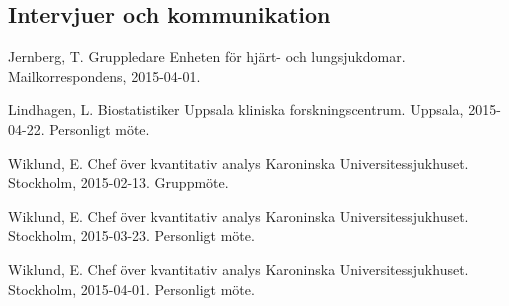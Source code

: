 \subsection{Intervjuer och kommunikation} 
	 	 		
Jernberg, T. Gruppledare Enheten för hjärt- och lungsjukdomar. Mailkorrespondens, 2015-04-01.	\newline				

Lindhagen, L. Biostatistiker Uppsala kliniska forskningscentrum. Uppsala, 2015-04-22. Personligt möte.\newline

Wiklund, E. Chef över kvantitativ analys Karoninska Universitessjukhuset. Stockholm, 2015-02-13. Gruppmöte.\newline

Wiklund, E. Chef över kvantitativ analys Karoninska Universitessjukhuset. Stockholm, 2015-03-23. Personligt möte.\newline

Wiklund, E. Chef över kvantitativ analys Karoninska Universitessjukhuset. Stockholm, 2015-04-01. Personligt möte.\newline


